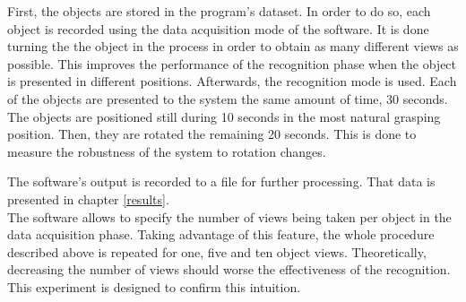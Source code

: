 

		First, the objects are stored in the program's dataset. 
		In order to do so, each object is recorded using the data acquisition mode of the software. 
		It is done turning the the object in the process in order to obtain as many different views as possible. 
		This improves the performance of the recognition phase when the object is presented in different positions. 
		Afterwards, the recognition mode is used.
		Each of the objects are presented to the system the same amount of time, 30 seconds. 
		The objects are positioned still during 10 seconds in the most natural grasping position. 
		Then, they are rotated the remaining 20 seconds. 
		This is done to measure the robustness of the system to rotation changes. 

		The software's output is recorded to a file for further processing. 
		That data is presented in chapter \ref{results}.
		\\

		The software allows to specify the number of views being taken per object in the data acquisition phase. 
		Taking advantage of this feature, the whole procedure described above is repeated for one, five and ten object views.
		Theoretically, decreasing the number of views should worse the effectiveness of the recognition. %
		This experiment is designed to confirm this intuition. 
		\\%






